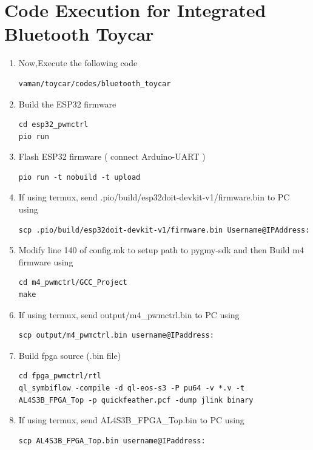 \section{Code Execution for Integrated Bluetooth Toycar}
\begin{enumerate}[resume]
\item Now,Execute the following code 

\begin{lstlisting}
vaman/toycar/codes/bluetooth_toycar
\end{lstlisting}

\item Build the ESP32 firmware
\begin{lstlisting}
cd esp32_pwmctrl
pio run
\end{lstlisting} 

\item Flash ESP32 firmware ( connect Arduino-UART  )
\begin{lstlisting}
pio run -t nobuild -t upload
\end{lstlisting} 

\item If using termux, send .pio/build/esp32doit-devkit-v1/firmware.bin to PC using
\begin{lstlisting}
scp .pio/build/esp32doit-devkit-v1/firmware.bin Username@IPAddress:
\end{lstlisting} 

\item  Modify line 140 of config.mk to setup path to pygmy-sdk and then Build m4 firmware using
\begin{lstlisting}
cd m4_pwmctrl/GCC_Project
make
\end{lstlisting}

\item If using termux, send output/m4{\_}pwmctrl.bin to PC using
\begin{lstlisting}
scp output/m4_pwmctrl.bin username@IPaddress:
\end{lstlisting} 

\item Build fpga source (.bin file)
\begin{lstlisting}
cd fpga_pwmctrl/rtl
ql_symbiflow -compile -d ql-eos-s3 -P pu64 -v *.v -t AL4S3B_FPGA_Top -p quickfeather.pcf -dump jlink binary 
\end{lstlisting} 

\item If using termux, send AL4S3B{\_}FPGA{\_}Top.bin to PC using
\begin{lstlisting}
scp AL4S3B_FPGA_Top.bin username@IPaddress:
\end{lstlisting} 


\end{enumerate}

